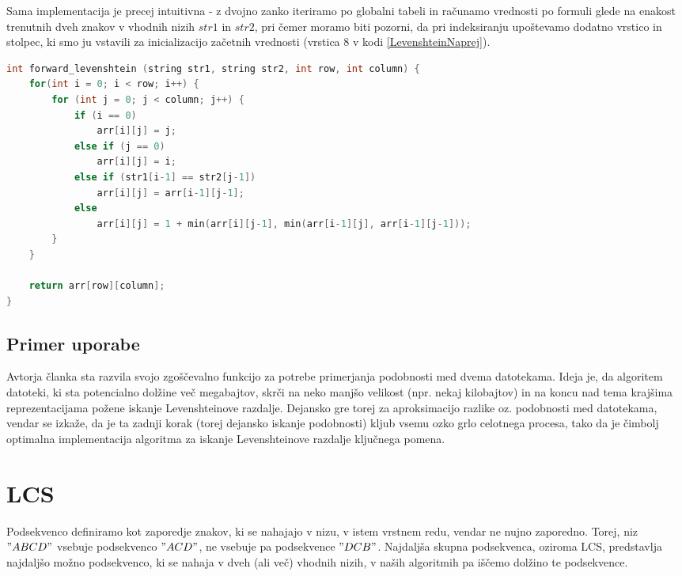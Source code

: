\documentclass[a4paper,12pt,openright]{book}
\begin{document}
\bigskip \bigskip

Sama implementacija je precej intuitivna - z dvojno zanko iteriramo po globalni tabeli in računamo vrednosti po formuli glede na enakost trenutnih dveh znakov v vhodnih nizih $str1$ in $str2$, pri čemer moramo biti pozorni, da pri indeksiranju upoštevamo dodatno vrstico in stolpec, ki smo ju vstavili za inicializacijo začetnih vrednosti (vrstica 8 v kodi \ref{LevenshteinNaprej}). \bigskip \bigskip

\begin{lstlisting}[language=C++, caption={Algoritem za izračun Levenshteinove razdalje}, captionpos=b, label=LevenshteinNaprej]
int forward_levenshtein (string str1, string str2, int row, int column) {
    for(int i = 0; i < row; i++) {
        for (int j = 0; j < column; j++) {    
            if (i == 0)
                arr[i][j] = j;
            else if (j == 0)
                arr[i][j] = i;
            else if (str1[i-1] == str2[j-1])
                arr[i][j] = arr[i-1][j-1];
            else 
                arr[i][j] = 1 + min(arr[i][j-1], min(arr[i-1][j], arr[i-1][j-1]));
        }
    }

    return arr[row][column];
}
\end{lstlisting}

\subsection{Primer uporabe}

Avtorja članka \cite{documentsimilarity} sta razvila svojo zgoščevalno funkcijo za potrebe primerjanja podobnosti med dvema datotekama. Ideja je, da algoritem datoteki, ki sta potencialno dolžine več megabajtov, skrči na neko manjšo velikost (npr. nekaj kilobajtov) in na koncu nad tema krajšima reprezentacijama požene iskanje Levenshteinove razdalje. Dejansko gre torej za aproksimacijo razlike oz. podobnosti med datotekama, vendar se izkaže, da je ta zadnji korak (torej dejansko iskanje podobnosti) kljub vsemu ozko grlo celotnega procesa, tako da je čimbolj optimalna implementacija algoritma za iskanje Levenshteinove razdalje ključnega pomena. 

\section{LCS}

Podsekvenco definiramo kot zaporedje znakov, ki se nahajajo v nizu, v istem vrstnem redu, vendar ne nujno zaporedno. Torej, niz $"ABCD"$ vsebuje podsekvenco $"ACD"$, ne vsebuje pa podsekvence $"DCB"$. Najdaljša skupna podsekvenca, oziroma LCS, predstavlja najdaljšo možno podsekvenco, ki se nahaja v dveh (ali več) vhodnih nizih, v naših algoritmih pa iščemo dolžino te podsekvence. 
\end{document}
